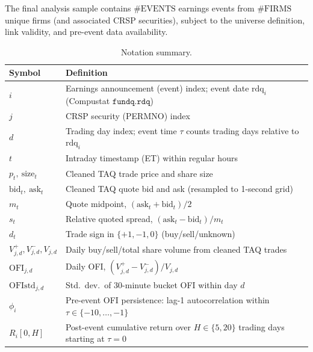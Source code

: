 The final analysis sample contains $\#\mathrm{EVENTS}$ earnings events from $\#\mathrm{FIRMS}$ unique firms (and associated CRSP securities), subject to the universe definition, link validity, and pre-event data availability.

\begin{table}[!t]
\centering
\caption{Notation summary.}
\label{tab:data_notation}
\begin{tabular}{l p{10cm}}
\hline
\textbf{Symbol} & \textbf{Definition} \\
\hline
$i$ & Earnings announcement (event) index; event date $\mathrm{rdq}_i$ 
\newline (Compustat $\texttt{fundq.rdq}$) \\
$j$ & CRSP security (PERMNO) index \\
$d$ & Trading day index; event time $\tau$ counts trading days relative to $\mathrm{rdq}_i$ \\
$t$ & Intraday timestamp (ET) within regular hours \\
$p_t,\ \text{size}_t$ & Cleaned TAQ trade price and share size \\
$\text{bid}_t,\ \text{ask}_t$ & Cleaned TAQ quote bid and ask (resampled to 1-second grid) \\
$m_t$ & Quote midpoint, $(\text{ask}_t+\text{bid}_t)/2$ \\
$s_t$ & Relative quoted spread, $(\text{ask}_t-\text{bid}_t)/m_t$ \\
$d_t$ & Trade sign in $\{+1,-1,0\}$ (buy/sell/unknown) \\
$V_{j,d}^{+},V_{j,d}^{-},V_{j,d}$ & Daily buy/sell/total share volume from cleaned TAQ trades \\
$\mathrm{OFI}_{j,d}$ & Daily OFI, $(V_{j,d}^{+}-V_{j,d}^{-})/V_{j,d}$ \\
$\mathrm{OFIstd}_{j,d}$ & Std.\ dev.\ of 30-minute bucket OFI within day $d$ \\
$\phi_i$ & Pre-event OFI persistence: lag-1 autocorrelation within $\tau\in\{-10,\ldots,-1\}$ \\
$R_i[0,H]$ & Post-event cumulative return over $H\in\{5,20\}$ trading days starting at $\tau=0$ \\
\hline
\end{tabular}
\end{table}
